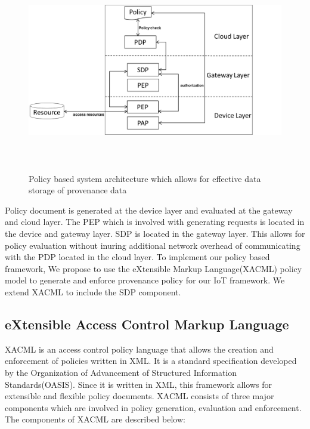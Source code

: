 \begin{figure}[h!]
\begin{center}
\includegraphics[height=3.5in]{policy_architecture.png}
\caption{Policy based system architecture which allows for effective data storage of provenance data}
\end{center}
\end{figure}


Policy document is generated at the device layer and evaluated at the gateway and cloud layer. The PEP which is involved with generating requests is located in the device and gateway layer. SDP is located in the gateway layer. This allows for policy evaluation without inuring additional network overhead of communicating with the PDP located in the cloud layer. To implement our policy based framework, We propose to use the eXtensible Markup Language(XACML) policy model \cite{xacml} to generate and enforce provenance policy for our IoT framework. We extend XACML to include the SDP component.

\subsection{eXtensible Access Control Markup Language}
 XACML is an access control policy language that allows the creation and enforcement of policies written in XML. It is a standard specification developed by the Organization of Advancement of Structured Information Standards(OASIS). Since it is written in XML, this framework allows for extensible and flexible policy documents. XACML consists of three major components which are involved in policy generation, evaluation and enforcement. The components of XACML are described below: 
 
